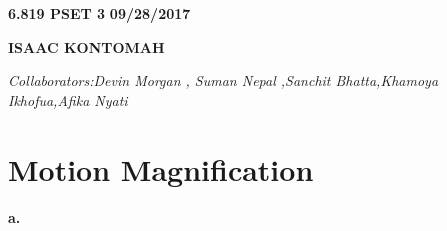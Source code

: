 \documentclass[a4paper,12pt]{article}
\begin{document}
\begin{flushleft}\newline \textbf{6.819 PSET 3}
\newline \textbf{09/28/2017}
\end{flushleft}
\newline \begin{center}\textbf{ISAAC KONTOMAH}
\end{center}
\begin{flushleft}
\newline \emph{Collaborators:Devin Morgan , Suman Nepal ,Sanchit Bhatta,Khamoya Ikhofua,Afika Nyati }
\end{flushleft}

\newline \section{Motion Magnification}
\newline \textbf{a.}
\end{document}
